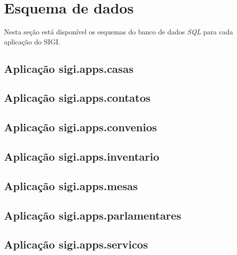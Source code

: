 %
%

\section{Esquema de dados}
\label{sec:esquema}

Nesta seção está disponível os esquemas do banco de dados \emph{SQL}
para cada aplicação do SIGI.

\subsection{Aplicação sigi.apps.casas}


\subsection{Aplicação sigi.apps.contatos}


\subsection{Aplicação sigi.apps.convenios}


\subsection{Aplicação sigi.apps.inventario}


\subsection{Aplicação sigi.apps.mesas}


\subsection{Aplicação sigi.apps.parlamentares}


\subsection{Aplicação sigi.apps.servicos}


%
%

